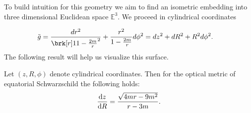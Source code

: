 To build intuition for this geometry we aim to find an isometric embedding into three dimensional Euclidean space $\mathbb{E}^3$. We proceed in cylindrical coordinates

\begin{align*}
\fermat &= \frac{dr^2}{\brk[r]1{1 - \frac{2m}{r}}^2} + \frac{r^2}{1 - \frac{2m}{r}} d\phi^2 = dz^2 + dR^2 + R^2 d\phi^2.
\end{align*}
The following result will help us visualize this surface.
\begin{proposition}[]\label{}
Let $(z, R, \phi)$ denote cylindrical coordinates. Then for the optical metric of equatorial Schwarzschild the following holds:
\begin{equation}\label{}
\diff{z}{R} = \frac{\sqrt{4mr-9m^2}}{r-3m}.
\end{equation}
\end{proposition}
